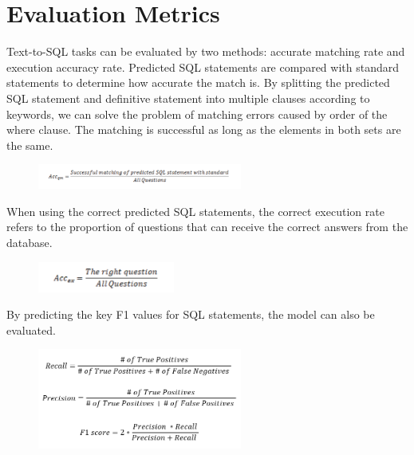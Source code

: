 \section{Evaluation Metrics}

Text-to-SQL tasks can be evaluated by two methods: accurate matching rate and execution accuracy rate. Predicted SQL statements are compared with standard statements to determine how accurate the match is.
By splitting the predicted SQL statement and definitive statement into multiple clauses according to keywords, we can solve the problem of matching errors caused by order of the where clause. The matching is successful as long as the elements in both sets are the same.

\begin{figure}[htb]
    \centering
    \includegraphics[width=0.6\textwidth]{pics/acc1.png}
    \label{fig:acc1}
\end{figure}

When using the correct predicted SQL statements, the correct execution rate refers to the proportion of questions that can receive the correct answers from the database.

\begin{figure}[htb]
    \centering
    \includegraphics[width=0.4\textwidth]{pics/acc2.png}
    \label{fig:acc2}
\end{figure}

By predicting the key F1 values for SQL statements, the model can also be evaluated.

\begin{figure}[htb]
    \centering
    \includegraphics[width=0.6\textwidth]{pics/f1.png}
    \label{fig:f1}
\end{figure}